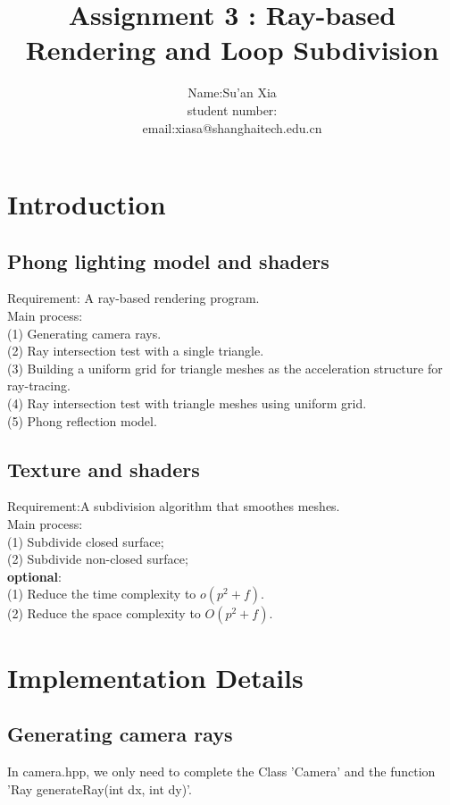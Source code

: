 \documentclass[acmtog]{acmart}
\title{Assignment 3 : Ray-based Rendering and Loop Subdivision}
\author{Name:\quad Su'an Xia  \\ student number:\quad 18047482
	\\email:\quad xiasa@shanghaitech.edu.cn}
\begin{document}
\maketitle

\vspace*{2 ex}


\section{Introduction}
\subsection{Phong lighting model and shaders}
Requirement: A ray-based rendering program.
\\Main process: 
\\(1) Generating camera rays.
\\(2) Ray intersection test with a single triangle.
\\(3) Building a uniform grid for triangle meshes as the acceleration structure for ray-tracing.
\\(4) Ray intersection test with triangle meshes using uniform grid.
\\(5) Phong reflection model.

\vspace*{1 ex}
\subsection{Texture and shaders}
Requirement:A subdivision algorithm that smoothes meshes.
\\Main process:
\\(1) Subdivide closed surface;
\\(2) Subdivide non-closed surface;
\\\textbf{optional}:
\\(1) Reduce the time complexity to $o(p^{2}+f)$.
\\(2) Reduce the space complexity to $O(p^{2}+f)$.

\vspace*{2 ex}
\section{Implementation Details}
\subsection{Generating camera rays}
In camera.hpp, we only need to complete the Class 'Camera' and the function 'Ray generateRay(int dx, int dy)'.
\end{document}
